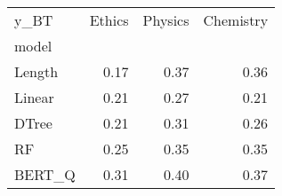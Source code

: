 \begin{tabular}{lrrr}
\toprule
y\_BT &  Ethics &  Physics &  Chemistry \\
model  &         &          &            \\
\midrule
Length &    0.17 &     0.37 &       0.36 \\
Linear &    0.21 &     0.27 &       0.21 \\
DTree  &    0.21 &     0.31 &       0.26 \\
RF     &    0.25 &     0.35 &       0.35 \\
BERT\_Q &    0.31 &     0.40 &       0.37 \\
\bottomrule
\end{tabular}
